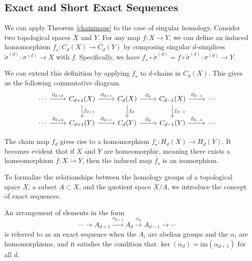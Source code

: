\subsection{Exact and Short Exact Sequences}
\label{Exact and Short Exact Sequences} We can apply Theorem \ref{chainmaps} to the
case of singular homology. Consider two topological spaces $X$ and $Y$. For any map
$f: X \rightarrow Y$, we can define an induced homomorphism
$f_{\star}: C_{d}(X) \rightarrow C_{d}(Y)$ by composing singular $d$-simplices
$\tilde{\sigma}^{(d)}: \sigma^{(d)}\rightarrow X$ with $f$. Specifically, we
have
$f_{\star} \circ \tilde{\sigma}^{(d)}= f \circ \tilde{\sigma}^{(d)}: \sigma^{(d)}
\rightarrow Y$.

We can extend this definition by applying $f_{\star}$ to $d$-chains in
$C_{d}(X)$. This gives us the following commutative diagram.
\begin{equation}
	\begin{tikzcd}
		\cdots \arrow[r, "\partial_{d+2}"] & C_{d+1}(X) \arrow[r, "\partial_{d+1}"] \arrow[d,
		"f_{d+1}"] & C_d(X) \arrow[r, "\partial_d"] \arrow[d, "f_d"] & C_{d-1}(X)
		\arrow[r, "\partial_{d-1}"] \arrow[d, "f_{d-1}"] & \cdots \\ \cdots \arrow[r,
		"\partial_{d+2}"] & C_{d+1}(Y) \arrow[r, "\partial_{d+1}"] & C_d(Y) \arrow[r,
		"\partial_d"] & C_{d-1}(Y) \arrow[r, "\partial_{d-1}"] & \cdots
	\end{tikzcd}
\end{equation}

The chain map $f_{d}$ gives rise to a homomorphism $f_{\star}: H_{d}(X) \rightarrow
H_{d}(Y)$. It becomes evident that if $X$ and $Y$ are homeomorphic, meaning there
exists a homeomorphism $f: X \rightarrow Y$, then the induced map $f_{\star}$ is
an isomorphism.

To formalize the relationships between the homology groups of a topological
space $X$, a subset $A \subset X$, and the quotient space $X/A$, we introduce the
concept of exact sequences.

\begin{definition}
	An arrangement of elements in the form
	\begin{equation}
		\cdots \rightarrow A_{d+1}\xrightarrow{\alpha_{d+1}}A_{d}\xrightarrow{\alpha_d}
		A_{d-1}\xrightarrow{}\cdots
	\end{equation}
	is referred to as an exact sequence when the $A_{i}$ are abelian groups and the
	$\alpha_{i}$ are homomorphisms, and it satisfies the condition that
	$\ker(\alpha_{d}) = \mathrm{im}(\alpha_{d+1})$ for all $d$.
\end{definition}

